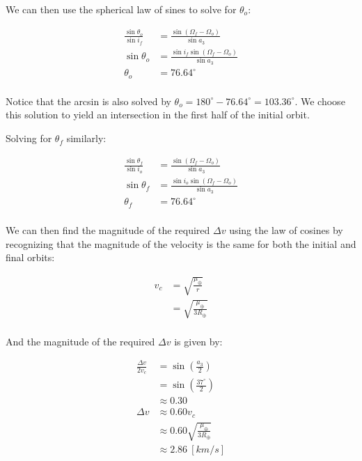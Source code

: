 We can then use the spherical law of sines to solve for $\theta_o$:

\begin{align*}
    \frac{\sin\theta_o}{\sin i_f} &= \frac{\sin(\Omega_f - \Omega_o)}{\sin a_3} \\
    \sin\theta_o &= \frac{\sin i_f \sin(\Omega_f - \Omega_o)}{\sin a_3} \\
    \theta_o &= 76.64^\circ \\
\end{align*}

Notice that the arcsin is also solved by $\theta_o = 180^\circ - 76.64^\circ = 103.36^\circ$. We choose this solution to yield an intersection in the first half of the initial orbit.

Solving for $\theta_f$ similarly:

\begin{align*}
    \frac{\sin\theta_f}{\sin i_o} &= \frac{\sin(\Omega_f - \Omega_o)}{\sin a_3} \\
    \sin\theta_f &= \frac{\sin i_o \sin(\Omega_f - \Omega_o)}{\sin a_3} \\
    \theta_f &= 76.64^\circ \\
\end{align*}

We can then find the magnitude of the required $\Delta v$ using the law of cosines by recognizing that the magnitude of the velocity is the same for both the initial and final orbits:

\begin{align*}
    v_c &= \sqrt{\frac{\mu_\oplus}{r}} \\
    &= \sqrt{\frac{\mu_\oplus}{3R_\oplus}} \\
\end{align*}

And the magnitude of the required $\Delta v$ is given by:

\begin{align*}
    \frac{\Delta v}{2 v_c} &= \sin\left( \frac{a_3}{2} \right) \\
    &= \sin\left( \frac{37^\circ}{2} \right) \\
    &\approx 0.30 \\
    \Delta v &\approx 0.60 v_c \\
    &\approx 0.60 \sqrt{\frac{\mu_\oplus}{3R_\oplus}} \\
    &\approx 2.86 \: [km/s] \\
\end{align*}

